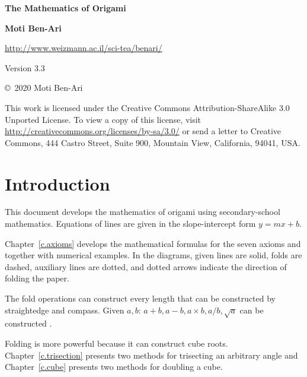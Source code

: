
\thispagestyle{empty}

\begin{center}
\textbf{\LARGE The Mathematics of Origami}

\bigskip
\bigskip

\textbf{\Large Moti Ben-Ari}

\bigskip
\bigskip

\url{http://www.weizmann.ac.il/sci-tea/benari/}

\bigskip
\bigskip

Version 3.3
\end{center}

\vfill

\begin{small}
\begin{center}
\copyright{}\ 2020 Moti Ben-Ari
\end{center}

This work is licensed under the Creative Commons Attribution-ShareAlike 3.0 Unported License. To view a copy of this license, visit \url{http://creativecommons.org/licenses/by-sa/3.0/} or send a letter to Creative Commons, 444 Castro Street, Suite 900, Mountain View, California, 94041, USA.
\end{small}

\tableofcontents



\chapter{Introduction}\label{c.introduction}

This document develops the mathematics of origami using secondary-school mathematics. Equations of lines are given in the slope-intercept form $y=mx+b$.

Chapter~\ref{c.axioms} develops the mathematical formulas for the seven axioms and together with numerical examples. In the diagrams, given lines are solid, folds are dashed, auxiliary lines are dotted, and dotted arrows indicate the direction of folding the paper.

The fold operations can construct every length that can be constructed by straightedge and compass. Given $a,b$: $a+b, a-b, a\times b, a/b, \sqrt{a}$ can be constructed \cite[Chapter~4]{hwa}.

Folding is more powerful because it can construct cube roots. Chapter~\ref{c.trisection} presents two methods for trisecting an arbitrary angle and Chapter~\ref{c.cube} presents two methods for doubling a cube.

